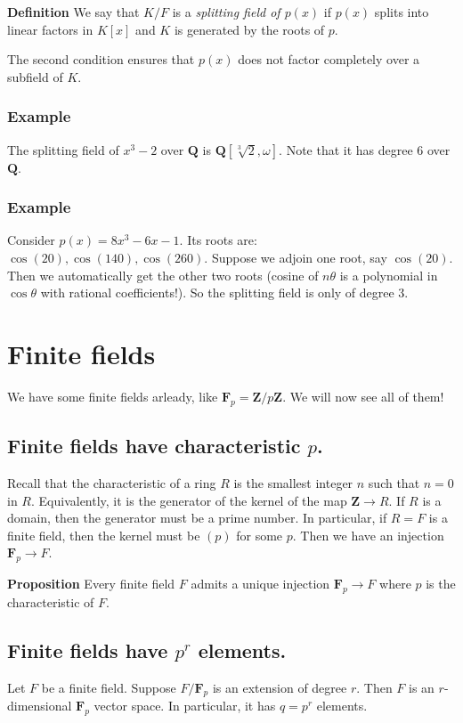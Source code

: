 \documentclass[11pt]{article}
\begin{document}
\textbf{\textbf{Definition}} We say that \(K/F\) is a \emph{splitting field of \(p(x)\)} if \(p(x)\) splits into linear factors in \(K[x]\) and \(K\) is generated by the roots of \(p\).

The second condition ensures that \(p(x)\) does not factor completely over a subfield of \(K\).
\subsubsection{Example}
\label{sec:org594fc2b}
The splitting field of \(x^3-2\) over \(\mathbf{Q}\) is \(\mathbf{Q}[\sqrt[3]{2}, \omega]\).
Note that it has degree 6 over \(\mathbf{Q}\).
\subsubsection{Example}
\label{sec:org0772509}
Consider \(p(x) = 8x^3-6x-1\).
Its roots are: \(\cos(20), \cos(140), \cos(260)\).
Suppose we adjoin one root, say \(\cos(20)\).
Then we automatically get the other two roots (cosine of \(n\theta\) is a polynomial in \(\cos \theta\) with rational coefficients!).
So the splitting field is only of degree 3.
\section{Finite fields}
\label{sec:org90d91da}
We have some finite fields arleady, like \(\mathbf{F}_p = \mathbf{Z} / p \mathbf{Z}\).
We will now see all of them!
\subsection{Finite fields have characteristic \(p\).}
\label{sec:org81f1fc9}
Recall that the characteristic of a ring \(R\) is the smallest integer \(n\) such that \(n = 0\) in \(R\).
Equivalently, it is the generator of the kernel of the map \(\mathbf{Z} \to R\).
If \(R\) is a domain, then the generator must be a prime number.
In particular, if \(R = F\) is a finite field, then the kernel must be \((p)\) for some \(p\).
Then we have an injection \(\mathbf{F}_p \to F\).

\textbf{\textbf{Proposition}} Every finite field \(F\) admits a unique injection \(\mathbf{F}_p \to F\) where \(p\) is the characteristic of \(F\).
\subsection{Finite fields have \(p^r\) elements.}
\label{sec:org86a6051}
Let \(F\) be a finite field.
Suppose \(F / \mathbf{F}_p\) is an extension of degree \(r\).
Then \(F\) is an \(r\)-dimensional \(\mathbf{F}_p\) vector space.
In particular, it has \(q = p^r\) elements.
\end{document}
